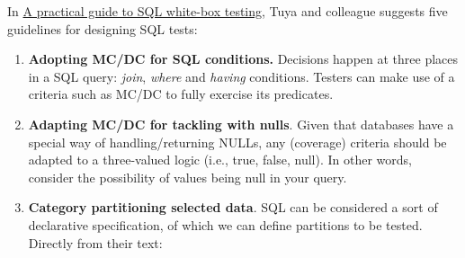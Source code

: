 In \href{https://dl.acm.org/doi/pdf/10.1145/1147214.1147221}{A practical
guide to SQL white-box testing}, Tuya and colleague suggests five
guidelines for designing SQL tests:

\begin{enumerate}
\def\labelenumi{\arabic{enumi}.}
\item
  \textbf{Adopting MC/DC for SQL conditions.} Decisions happen at three
  places in a SQL query: \emph{join}, \emph{where} and \emph{having}
  conditions. Testers can make use of a criteria such as MC/DC to fully
  exercise its predicates.
\item
  \textbf{Adapting MC/DC for tackling with nulls}. Given that databases
  have a special way of handling/returning NULLs, any (coverage)
  criteria should be adapted to a three-valued logic (i.e., true, false,
  null). In other words, consider the possibility of values being null
  in your query.
\item
  \textbf{Category partitioning selected data}. SQL can be considered a
  sort of declarative specification, of which we can define partitions
  to be tested. Directly from their text:


\end{enumerate}
